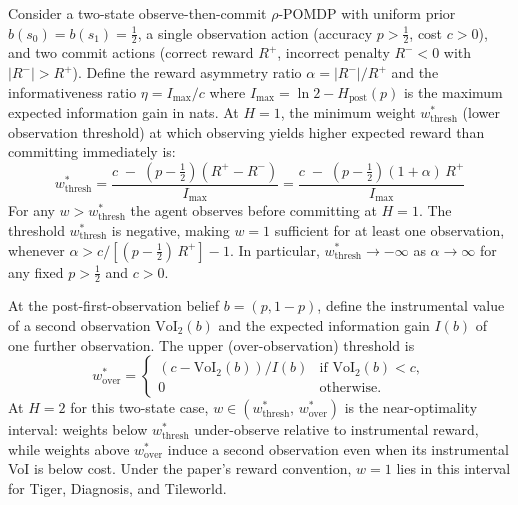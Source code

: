 \documentclass[runningheads]{llncs}
\begin{document}
\begin{proposition}
\label{prop:nearopt}
Consider a two-state observe-then-commit $\rho$-POMDP with uniform prior $b(s_0){=}b(s_1){=}\tfrac{1}{2}$, a single observation action (accuracy $p > \tfrac{1}{2}$, cost $c > 0$), and two commit actions (correct reward $R^+$, incorrect penalty $R^- < 0$ with $|R^-| > R^+$). Define the reward asymmetry ratio $\alpha = |R^-|/R^+$ and the informativeness ratio $\eta = I_{\max}/c$ where $I_{\max} = \ln 2 - H_{\text{post}}(p)$ is the maximum expected information gain in nats. At $H{=}1$, the minimum weight $w^*_{\mathrm{thresh}}$ (lower observation threshold) at which observing yields higher expected reward than committing immediately is:
\begin{equation*}
    w^*_{\mathrm{thresh}} = \frac{c \;-\; \left(p - \tfrac{1}{2}\right)(R^+ - R^-)}{\,I_{\max}\,} = \frac{c \;-\; \left(p - \tfrac{1}{2}\right)(1 + \alpha)\,R^+}{\,I_{\max}\,}
\end{equation*}
For any $w > w^*_{\mathrm{thresh}}$ the agent observes before committing at $H{=}1$. The threshold $w^*_{\mathrm{thresh}}$ is negative, making $w{=}1$ sufficient for at least one observation, whenever $\alpha > c / [(p - \tfrac{1}{2})\,R^+] - 1$. In particular, $w^*_{\mathrm{thresh}} \to -\infty$ as $\alpha \to \infty$ for any fixed $p > \tfrac{1}{2}$ and $c > 0$.

At the post-first-observation belief $b{=}(p, 1{-}p)$, define the instrumental value of a second observation $\mathrm{VoI}_2(b)$ and the expected information gain $I(b)$ of one further observation. The upper (over-observation) threshold is
\begin{equation*}
    w^*_{\mathrm{over}} = \begin{cases}
    (c - \mathrm{VoI}_2(b)) / I(b) & \text{if } \mathrm{VoI}_2(b) < c, \\
    0 & \text{otherwise.}
    \end{cases}
\end{equation*}
At $H{=}2$ for this two-state case, $w \in (w^*_{\mathrm{thresh}},\, w^*_{\mathrm{over}})$ is the near-optimality interval: weights below $w^*_{\mathrm{thresh}}$ under-observe relative to instrumental reward, while weights above $w^*_{\mathrm{over}}$ induce a second observation even when its instrumental VoI is below cost. Under the paper's reward convention, $w{=}1$ lies in this interval for Tiger, Diagnosis, and Tileworld.
\end{proposition}
\end{document}
